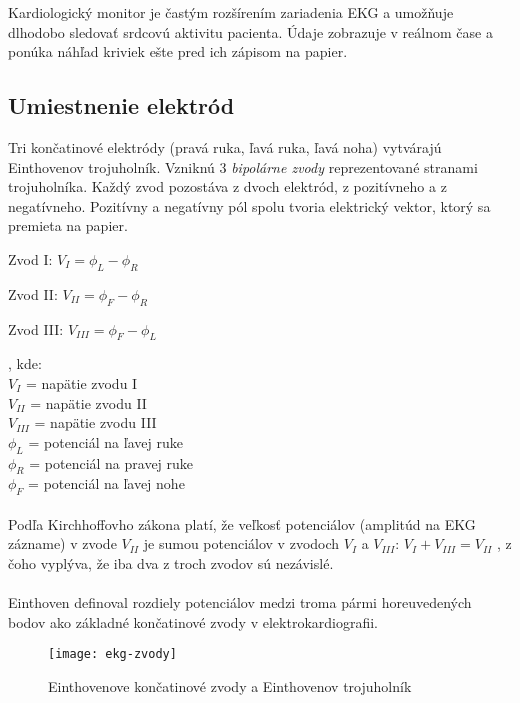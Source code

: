 \documentclass[titlepage,12pt]{article}
\begin{document}
Kardiologický monitor je častým rozšírením zariadenia EKG a umožňuje dlhodobo sledovať srdcovú aktivitu pacienta. Údaje zobrazuje v reálnom čase a ponúka náhľad kriviek ešte pred ich zápisom na papier.


\newpage

\subsection{Umiestnenie elektród}
Tri končatinové elektródy (pravá ruka, ľavá ruka, ľavá noha)  vytvárajú Einthovenov trojuholník. Vzniknú 3 \emph{bipolárne zvody} reprezentované stranami trojuholníka. Každý zvod pozostáva z dvoch elektród, z pozitívneho a z negatívneho. Pozitívny a negatívny pól spolu tvoria elektrický vektor, ktorý sa premieta na papier.

\begin{description}
	\item Zvod I: \tabto{1cm} $V_{I} = \phi_L - \phi_R$
	\item Zvod II: \tabto{1cm} $V_{II} = \phi_F - \phi_R$
	\item Zvod III:	\tabto{1cm} $V_{III} = \phi_F - \phi_L$
\end{description}
, kde: \\
\tabto{1cm} $V_{I}$ = napätie zvodu I\\
\tabto{1cm} $V_{II}$ = napätie zvodu II\\
\tabto{1cm} $V_{III}$ = napätie zvodu III\\
\tabto{1cm} $\phi_L$ = potenciál na ľavej ruke\\
\tabto{1cm} $\phi_R$ = potenciál na pravej ruke\\
\tabto{1cm} $\phi_F$ = potenciál na ľavej nohe\\
\\
Podľa Kirchhoffovho zákona platí, že veľkosť potenciálov (amplitúd na EKG zázname) v zvode $V_{II}$ je sumou potenciálov v zvodoch $V_{I}$ a  $V_{III}$:
\tabto{1cm} $V_{I} + V_{III} = V_{II}$
, z čoho vyplýva, že iba dva z troch zvodov sú nezávislé.
\\
\\
Einthoven definoval rozdiely potenciálov medzi troma pármi horeuvedených bodov ako základné končatinové zvody v elektrokardiografii.


\begin{figure}[!ht]
\begin{center}
\texttt{[image: ekg-zvody]}
\caption{Einthovenove končatinové zvody a Einthovenov trojuholník}
\end{center}
\end{figure}
\end{document}
